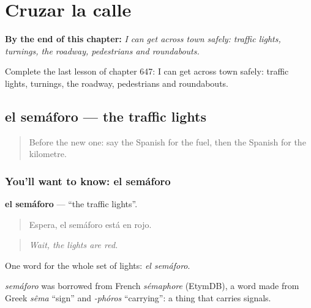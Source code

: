 
\chapter{Cruzar la calle}
\label{ch:es-cruzar-la-calle}

\begin{chapteropening}
\textbf{By the end of this chapter:} \emph{I can get across town safely: traffic lights, turnings, the roadway, pedestrians and roundabouts.}

Complete the last lesson of chapter 647: I can get across town safely: traffic lights, turnings, the roadway, pedestrians and roundabouts.
\end{chapteropening}

\section[el semáforo]{el semáforo — the traffic lights}

\label{lesson:ES-C647-semaforo}



\begin{quote}
Before the new one: say the Spanish for the fuel, then the Spanish for the kilometre.
\end{quote}

\subsection*{You'll want to know: el semáforo}
\textbf{el semáforo} — \textquotedblleft{}the traffic lights\textquotedblright{}.

\begin{quote}
Espera, el semáforo está en rojo.
\end{quote}

\begin{quote}
\emph{Wait, the lights are red.}
\end{quote}

One word for the whole set of lights: \emph{el semáforo}.

\begin{cousinweb}
\emph{semáforo} was borrowed from French \emph{sémaphore} (EtymDB), a word made from Greek \emph{sêma} \textquotedblleft{}sign\textquotedblright{} and \emph{-phóros} \textquotedblleft{}carrying\textquotedblright{}: a thing that carries signals.
\end{cousinweb}

